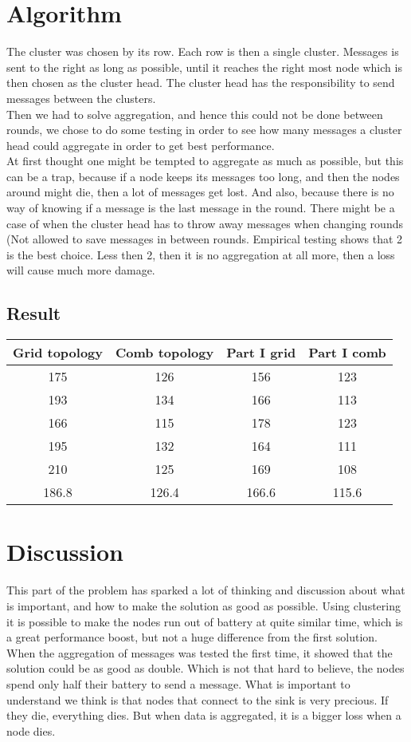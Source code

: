 \documentclass{article}
\begin{document}
  \section{Algorithm}
   The cluster was chosen by its row. Each row is then a single cluster. Messages
   is sent to the right as long as possible, until it reaches the right most
   node which is then chosen as the cluster head. The cluster head has the
   responsibility to send messages between the clusters.\\
   Then we had to solve aggregation, and hence this could not be done between
   rounds, we chose to do some testing in order to see how many messages a cluster
   head could aggregate in order to get best performance.\\
   At first thought one might be tempted to aggregate as much as possible, but
   this can be a trap, because if a node keeps its messages too long, and then
   the nodes around might die, then a lot of messages get lost. And also, because
   there is no way of knowing if a message is the last message in the round. There might be
   a case of when the cluster head has to throw away messages when changing
   rounds (Not allowed to save messages in between rounds. Empirical testing
   shows that 2 is the best choice. Less then 2, then it is no aggregation at all
   more, then a loss will cause much more damage. 

  \subsection{Result}
    \begin{tabular}{c|c||c|c}
      Grid topology & Comb topology & Part I grid & Part I comb\\
      \hline
      \hline
     175 &126  &156 & 123 \\
     193 &134  &166 & 113 \\
     166 &115  &178 & 123 \\
     195 &132  &164 & 111 \\
     210 &125  &169 & 108 \\
      \hline
      186.8&126.4&166.6&115.6\\
    \end{tabular}

  \section{Discussion}
  This part of the problem has sparked a lot of thinking and discussion about what
  is important, and how to make the solution as good as possible. Using clustering 
  it is possible to make the nodes run out of battery at quite similar time, which
  is a great performance boost, but not a huge difference from the first solution.
  When the aggregation of messages was tested the first time, it showed that the
  solution could be as good as double. Which is not that hard to believe, the nodes
  spend only half their battery to send a message. What is important to understand
  we think is that nodes that connect to the sink is very precious. If they die, 
  everything dies. But when data is aggregated, it is a bigger loss when a node
  dies.
\end{document}
